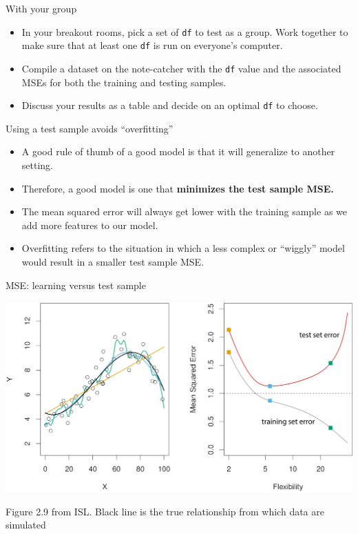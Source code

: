 \documentclass[table]{beamer}\usepackage[]{graphicx}\usepackage[]{color}
\begin{document}
\begin{frame}[fragile]{With your group}

\begin{itemize}
\item In your breakout rooms, pick a set of {\tt df} to test as a group. Work together to make sure that at least one {\tt df} is run on everyone's computer.
\item Compile a dataset on the note-catcher with the {\tt df} value and the associated MSEs for both the training and testing samples.
\item Discuss your results as a table and decide on an optimal {\tt df} to choose.
\end{itemize}

\end{frame}


\begin{frame}{Using a test sample avoids ``overfitting''}
\begin{itemize}
  \item A good rule of thumb of a good model is that it will generalize to another setting.
  \item Therefore, a good model is one that {\bf minimizes the test sample MSE.}
  \item The mean squared error will always get lower with the training sample as we add more features to our model.
  \item {\color{orange} Overfitting} refers to the situation in which a less complex or ``wiggly'' model would result in a smaller test sample MSE.
\end{itemize}
\end{frame}



\begin{frame}{MSE: learning versus test sample}
\centerline{
\includegraphics[scale=.6,angle=0]{figure-static/2_9-all.pdf}
}

Figure 2.9 from ISL. Black line is the true relationship from which data are simulated
\end{frame}
\end{document}
